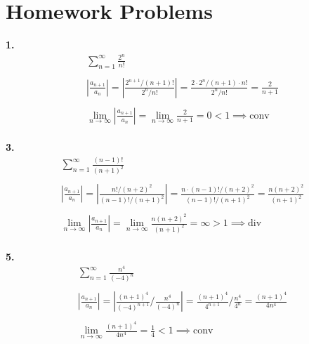 \documentclass{article}
\begin{document}
\newpage

\section*{Homework Problems}



\noindent
\textbf{1.}
\begin{gather*}
\sum_{n=1}^{\infty} \frac{2^n}{n!}
\\
\\
\left|
\frac{a_{n+1}}{a_n}
\right|
=\left|
\frac{2^{n+1} / (n+1)!}{2^n / n!}
\right|
=\frac{2 \cdot 2^{n} / (n+1) \cdot n!}{2^n / n!}
=\frac{2}{n+1}
\\
\\
\lim_{n \to \infty}
\left|
\frac{a_{n+1}}{a_n}
\right|
=\lim_{n \to \infty}
\frac{2}{n+1}=0<1 \implies \text{conv}
\end{gather*}
\hfill
\\



\noindent
\textbf{3.}
\begin{gather*}
\sum_{n=1}^{\infty} \frac{(n-1)!}{(n+1)^2}
\\
\\
\left|
\frac{a_{n+1}}{a_n}
\right|
=\left|
\frac{ n! / (n+2)^2 }{ (n-1)! / (n+1)^2 }
\right|
=\frac{ n \cdot (n-1)! / (n+2)^2 }{ (n-1)! / (n+1)^2 }
=\frac{n(n+2)^2}{(n+1)^2}
\\
\\
\lim_{n \to \infty}
\left|
\frac{a_{n+1}}{a_n}
\right|
=
\lim_{n \to \infty} \frac{n(n+2)^2}{(n+1)^2}
= \infty > 1
\implies \text{div}
\end{gather*}
\hfill
\\



\noindent
\textbf{5.}
\begin{gather*}
\sum_{n=1}^{\infty} \frac{n^4}{(-4)^n}
\\
\\
\left|
\frac{a_{n+1}}{a_n}
\right|
=\left|
\frac{(n+1)^4}{(-4)^{n+1}} / \frac{n^4}{(-4)^n}
\right|
=\frac{(n+1)^4}{4^{n+1}} / \frac{n^4}{4^n}
=\frac{(n+1)^4}{4n^4}
\\
\\
\lim_{n \to \infty} \frac{(n+1)^4}{4n^4}
=\frac{1}{4} < 1 \implies \text{conv}
\end{gather*}
\hfill
\\
\end{document}

